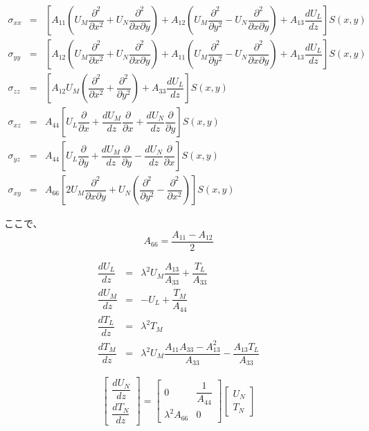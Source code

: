 \[\begin{aligned}
\sigma_{xx} & = & \left[A_{11}\left(U_{M}\dfrac{\partial^{2}}{\partial x^{2}}+U_{N}\dfrac{\partial^{2}}{\partial x\partial y}\right)+A_{12}\left(U_{M}\dfrac{\partial^{2}}{\partial y^{2}}-U_{N}\dfrac{\partial^{2}}{\partial x\partial y}\right)+A_{13}\dfrac{dU_{L}}{dz}\right]S\left(x,y\right)\\
\sigma_{yy} & = & \left[A_{12}\left(U_{M}\dfrac{\partial^{2}}{\partial x^{2}}+U_{N}\dfrac{\partial^{2}}{\partial x\partial y}\right)+A_{11}\left(U_{M}\dfrac{\partial^{2}}{\partial y^{2}}-U_{N}\dfrac{\partial^{2}}{\partial x\partial y}\right)+A_{13}\dfrac{dU_{L}}{dz}\right]S\left(x,y\right)\\
\sigma_{zz} & = & \left[A_{12}U_{M}\left(\dfrac{\partial^{2}}{\partial x^{2}}+\dfrac{\partial^{2}}{\partial y^{2}}\right)+A_{33}\dfrac{dU_{L}}{dz}\right]S\left(x,y\right)\\
\sigma_{xz} & = & A_{44}\left[U_{L}\dfrac{\partial}{\partial x}+\dfrac{dU_{M}}{dz}\dfrac{\partial}{\partial x}+\dfrac{dU_{N}}{dz}\dfrac{\partial}{\partial y}\right]S\left(x,y\right)\\
\sigma_{yz} & = & A_{44}\left[U_{L}\dfrac{\partial}{\partial y}+\dfrac{dU_{M}}{dz}\dfrac{\partial}{\partial y}-\dfrac{dU_{N}}{dz}\dfrac{\partial}{\partial x}\right]S\left(x,y\right)\\
\sigma_{xy} & = & A_{66}\left[2U_{M}\dfrac{\partial^{2}}{\partial x\partial y}+U_{N}\left(\dfrac{\partial^{2}}{\partial y^{2}}-\dfrac{\partial^{2}}{\partial x^{2}}\right)\right]S\left(x,y\right)\end{aligned}\]

ここで、 \[A_{66}=\dfrac{A_{11}-A_{12}}{2}\]

\[\begin{aligned}
\dfrac{dU_{L}}{dz} & = & \lambda^{2}U_{M}\dfrac{A_{13}}{A_{33}}+\dfrac{T_{L}}{A_{33}}\\
\dfrac{dU_{M}}{dz} & = & -U_{L}+\dfrac{T_{M}}{A_{44}}\\
\dfrac{dT_{L}}{dz} & = & \lambda^{2}T_{M}\\
\dfrac{dT_{M}}{dz} & = & \lambda^{2}U_{M}\dfrac{A_{11}A_{33}-A_{13}^{2}}{A_{33}}-\dfrac{A_{13}T_{L}}{A_{33}}\end{aligned}\]

\[\left[\begin{array}{c}
\dfrac{dU_{N}}{dz}\\
\dfrac{dT_{N}}{dz}
\end{array}\right]=\left[\begin{array}{cc}
0 & \dfrac{1}{A_{44}}\\
\lambda^{2}A_{66} & 0
\end{array}\right]\left[\begin{array}{c}
U_{N}\\
T_{N}
\end{array}\right]\]

